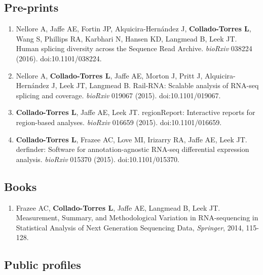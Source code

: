 \subsection{Pre-prints}
    \begin{enumerate}
        \item Nellore A, Jaffe AE, Fortin JP, Alquicira-Hernández J, \textbf{Collado-Torres L}, Wang S, Phillips RA, Karbhari N, Hansen KD, Langmead B, Leek JT. Human splicing diversity across the Sequence Read Archive. \emph{bioRxiv} 038224 (2016). doi:10.1101/038224.
        \item Nellore A, \textbf{Collado-Torres L}, Jaffe AE, Morton J, Pritt J, Alquicira-Hernández J, Leek JT, Langmead B. Rail-RNA: Scalable analysis of RNA-seq splicing and coverage. \emph{bioRxiv} 019067 (2015). doi:10.1101/019067.
        \item \textbf{Collado-Torres L}, Jaffe AE, Leek JT. regionReport: Interactive reports for region-based analyses. \emph{bioRxiv} 016659 (2015). doi:10.1101/016659.
        \item \textbf{Collado-Torres L}, Frazee AC, Love MI, Irizarry RA, Jaffe AE, Leek JT. derfinder: Software for annotation-agnostic RNA-seq differential expression analysis. \emph{bioRxiv} 015370 (2015). doi:10.1101/015370.
    \end{enumerate}
\subsection{Books}
    \begin{enumerate}
        \item Frazee AC, \textbf{Collado-Torres L}, Jaffe AE, Langmead B, Leek JT. Measurement, Summary, and Methodological Variation in RNA-sequencing in Statistical Analysis of Next Generation Sequencing Data, \emph{Springer}, 2014, 115-128.
    \end{enumerate}
\subsection{Public profiles}

